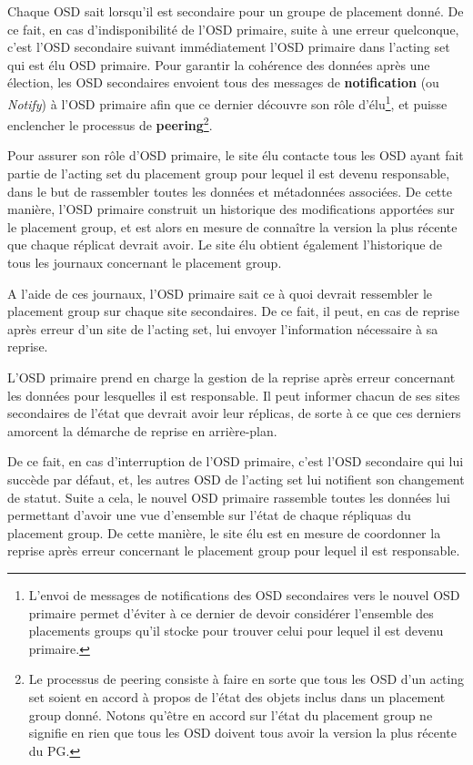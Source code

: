 Chaque OSD sait lorsqu'il est secondaire pour un groupe de placement donné. De ce fait, en cas d'indisponibilité de l'OSD primaire, suite à une erreur quelconque, c'est l'OSD secondaire suivant immédiatement l'OSD primaire dans l'acting set qui est élu OSD primaire. Pour garantir la cohérence des données après une élection, les OSD secondaires envoient tous des messages de \textbf{notification} (ou \emph{Notify}) à l'OSD primaire afin que ce dernier découvre son rôle d'\og{}élu\fg{}\footnote{L'envoi de messages de notifications des OSD secondaires vers le nouvel OSD primaire permet d'éviter à ce dernier de devoir considérer l'ensemble des placements groups qu'il stocke pour trouver celui pour lequel il est devenu primaire.}, et puisse enclencher le processus de \textbf{peering}\footnote{Le processus de peering consiste à faire en sorte que tous les OSD d'un acting set soient en accord à propos de l'état des objets inclus dans un placement group donné. Notons qu'être en accord sur l'état du placement group ne signifie en rien que tous les OSD doivent tous avoir la version la plus récente du PG.}. 

Pour assurer son rôle d'OSD primaire, le site élu contacte tous les OSD ayant fait partie de l'acting set du placement group pour lequel il est devenu responsable, dans le but de rassembler toutes les données et métadonnées associées. De cette manière, l'OSD primaire construit un historique des modifications apportées sur le placement group, et est alors en mesure de connaître la version la plus récente que chaque réplicat devrait avoir. Le site élu obtient également l'historique de tous les journaux concernant le placement group. 

A l'aide de ces journaux, l'OSD primaire sait ce à quoi devrait \og{}ressembler\fg{} le placement group sur chaque site secondaires. De ce fait, il peut, en cas de reprise après erreur d'un site de l'acting set, lui envoyer l'information nécessaire à sa reprise. 

\begin{PimpedBox}
L'OSD primaire prend en charge la gestion de la reprise après erreur concernant les données pour lesquelles il est responsable. Il peut informer chacun de ses sites secondaires de l'état que devrait avoir leur réplicas, de sorte à ce que ces derniers amorcent la démarche de reprise en arrière-plan.
\end{PimpedBox}

De ce fait, en cas d'interruption de l'OSD primaire, c'est l'OSD secondaire qui lui succède par défaut, et, les autres OSD de l'acting set lui notifient son changement de statut. Suite a cela, le nouvel OSD primaire rassemble toutes les données lui permettant d'avoir une vue d'ensemble sur l'état de chaque répliquas du placement group. De cette manière, le site élu est en mesure de coordonner la reprise après erreur concernant le placement group pour lequel il est responsable.

